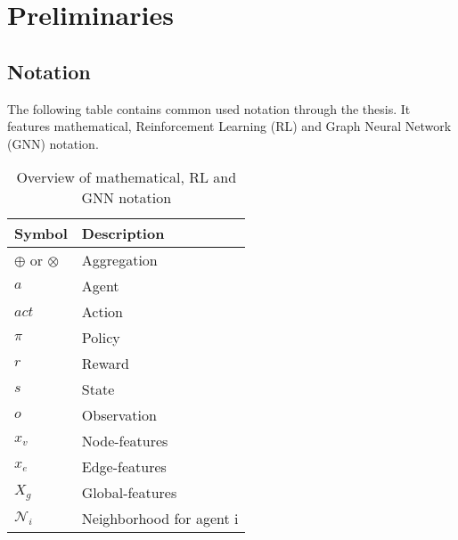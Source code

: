 
\chapter{Preliminaries}
\label{ch:Preliminaries}

\section{Notation}

\newcommand{\agent}{a}
\newcommand{\actions}{A}
\newcommand{\action}{act}
\newcommand{\policy}{pi}
\newcommand{\observation}{o}
\newcommand{\observations}{O}
\newcommand{\advantage}{A}
\newcommand{\reward}{r}
\newcommand{\state}{s}
\newcommand{\states}{S}
\newcommand{\graph}{G}
\newcommand{\nodes}{V}
\newcommand{\node}{v}
\newcommand{\nodefeatures}{X_v}
\newcommand{\nodefeature}{x_v}
\newcommand{\edges}{E}
\newcommand{\edge}{e}
\newcommand{\edgefeatures}{X_e}
\newcommand{\edgefeature}{x_e}
\newcommand{\globalfeatures}{X_g}
\newcommand{\globalfeature}{x_g}
\newcommand{\neighborhood}{N}

The following table contains common used notation through the thesis. It features mathematical, Reinforcement Learning (RL) and Graph Neural Network (GNN) notation.

\begin{table}[ht!]
	\caption{Overview of mathematical, RL and GNN notation}
	\vspace*{0.5cm}
	\centering
	\begin{tabular}{ll}
		\toprule
		Symbol & Description \\
		\midrule
		$\oplus$ or $\otimes$ & Aggregation \\
		\midrule
		$\agent$ & Agent \\
		$\action$ & Action \\
		$\pi$ & Policy \\
		$\reward$ & Reward \\
		$\state$ & State \\
		$\observation$ & Observation \\
		\midrule
		$\nodefeature$ & Node-features \\
		$\edgefeature$ & Edge-features \\
		$\globalfeatures$ & Global-features \\
		$\mathcal{\neighborhood}_i$ & Neighborhood for agent i \\
		\bottomrule
	\end{tabular}
	\label{tab:macros}
\end{table}


